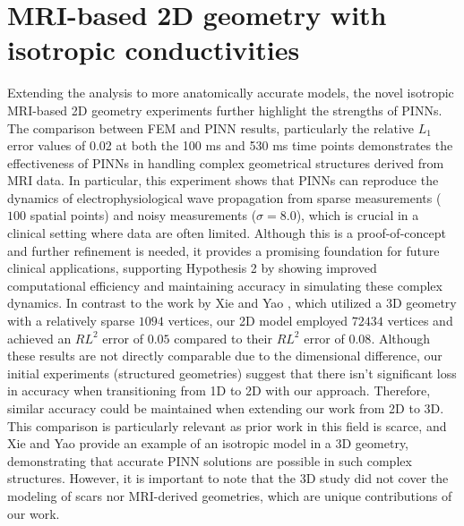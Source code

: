 

\section{MRI-based 2D geometry with isotropic conductivities}
Extending the analysis to more anatomically accurate models, the novel isotropic MRI-based 2D geometry experiments further highlight the strengths of PINNs. The comparison between FEM and PINN results, particularly the relative $ L_1$ error values of 0.02 at both the 100 ms and 530 ms time points demonstrates the effectiveness of PINNs in handling complex geometrical structures derived from MRI data. In particular, this experiment shows that PINNs can reproduce the dynamics of electrophysiological wave propagation from sparse measurements ($100$ spatial points) and noisy measurements ($\sigma=8.0$), which is crucial in a clinical setting where data are often limited. Although this is a proof-of-concept and further refinement is needed, it provides a promising foundation for future clinical applications, supporting Hypothesis 2 by showing improved computational efficiency and maintaining accuracy in simulating these complex dynamics. 
In contrast to the work by Xie and Yao \cite{PDL}, which utilized a 3D geometry with a relatively sparse $1094$ vertices, our 2D model employed $72434$ vertices and achieved an \(RL^2\) error of $0.05$ compared to their \(RL^2\) error of $0.08$. Although these results are not directly comparable due to the dimensional difference, our initial experiments (structured geometries) suggest that there isn't significant loss in accuracy when transitioning from 1D to 2D with our approach. Therefore, similar accuracy could be maintained when extending our work from 2D to 3D.
This comparison is particularly relevant as prior work in this field is scarce, and Xie and Yao \cite{PDL} provide an example of an isotropic model in a 3D geometry, demonstrating that accurate PINN solutions are possible in such complex structures. However, it is important to note that the 3D study did not cover the modeling of scars nor MRI-derived geometries, which are unique contributions of our work. 

